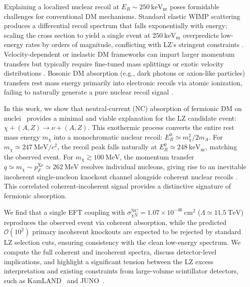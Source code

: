 \documentclass[aps,twocolumn,superscriptaddress,groupedaddress,nofootinbib,floatfix]{revtex4}
\begin{document}
Explaining a localized nuclear recoil at $E_R \sim 250\ \text{keV}_{\text{nr}}$ poses formidable challenges for conventional DM mechanisms. Standard elastic WIMP scattering produces a differential recoil spectrum that falls exponentially with energy; scaling the cross section to yield a single event at $250\ \text{keV}_{\text{nr}}$ overpredicts low-energy rates by orders of magnitude, conflicting with LZ's stringent constraints \cite{LZ2024SI}. Velocity-dependent or inelastic DM frameworks can impart larger momentum transfers but typically require fine-tuned mass splittings or exotic velocity distributions \cite{Hochberg2018,Bringmann2019,Cappiello2019}. Bosonic DM absorption (e.g., dark photons or axion-like particles) transfers rest mass energy primarily into electronic recoils via atomic ionization, failing to naturally generate a pure nuclear recoil signal \cite{Pospelov2008,An2015}.


In this work, we show that neutral-current (NC) absorption of fermionic DM on nuclei~\cite{Dror:2019onn,Dror:2019dib} provides a minimal and viable explanation for the LZ candidate event: $\chi + (A,Z) \rightarrow \nu + (A,Z)$. This exothermic process converts the entire rest mass energy $m_\chi$ into a monochromatic nuclear recoil: $E_R^0\simeq m_\chi^2 /2 m_A$. For $m_\chi \simeq 247\ \text{MeV}/c^2$, the recoil peak falls naturally at $E_R^0 \simeq 248\ \text{keV}_{\text{nr}}$, matching the observed event. For $m_\chi \gtrsim 100\ \text{MeV}$, the momentum transfer $q \simeq m_\chi \sim p_F^{\text{Xe}} \simeq 262\ \text{MeV}$ resolves individual nucleons, giving rise to an inevitable incoherent single-nucleon knockout channel alongside coherent nuclear recoils \cite{Ge:2024euk}. This correlated coherent-incoherent signal provides a distinctive signature of fermionic absorption.


We find that a single EFT coupling with $\sigma_{\chi N}^{\text{NC}} = 1.07\times10^{-46}\ \text{cm}^2$ ($\Lambda \simeq 11.5\ \text{TeV}$) reproduces the observed event via coherent absorption, while the predicted $\mathcal{O}(10^2)$ primary incoherent knockouts are expected to be rejected by standard LZ selection cuts, ensuring consistency with the clean low-energy spectrum. We compute the full coherent and incoherent spectra, discuss detector-level implications, and highlight a significant tension between the LZ excess interpretation and existing constraints
from large-volume scintillator detectors, such as KamLAND~\cite{KamLAND:2011bnd} and JUNO~\cite{JUNO:2022lpc}. 
\end{document}
